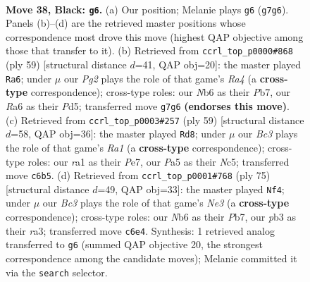 \documentclass[11pt]{article}
\begin{document}
\clearpage

\begin{figure}[p]\centering
\begin{subfigure}{0.46\textwidth}\centering
\resizebox{\linewidth}{!}{%
\newchessgame
\chessboard[
  setfen={5k2/2r2ppp/rnbN4/p3p1P1/8/1P2P1R1/P3K1PP/RN6 b - - 5 38},
  showmover=false,
  pgfstyle=straightmove, color=movearrow, markmove={g7-g6}
]}
\caption{}
\end{subfigure}\hfill
\begin{subfigure}{0.46\textwidth}\centering
\resizebox{\linewidth}{!}{%
\newchessgame
\chessboard[
  setfen={1b2r3/1p3pk1/5p2/r2p3p/p2N4/P1P5/1P3RPP/1K3R2 b - - 5 30},
  showmover=false,
  pgfstyle=straightmove, color=movearrow, markmove={a5-a6}
]}
\caption{}
\end{subfigure}
\\[4pt]
\begin{subfigure}{0.46\textwidth}\centering
\resizebox{\linewidth}{!}{%
\newchessgame
\chessboard[
  setfen={r7/pp2ppk1/6p1/2nPNbP1/3R4/4R1K1/P3PPB1/2r5 b - - 4 30},
  showmover=false,
  pgfstyle=straightmove, color=movearrow, markmove={a8-d8}
]}
\caption{}
\end{subfigure}\hfill
\begin{subfigure}{0.46\textwidth}\centering
\resizebox{\linewidth}{!}{%
\newchessgame
\chessboard[
  setfen={4r3/pp1r1p1k/4n2p/3p1N1P/3P2P1/R7/PP4R1/1K6 b - - 8 38},
  showmover=false,
  pgfstyle=straightmove, color=movearrow, markmove={e6-f4}
]}
\caption{}
\end{subfigure}
\caption{\textbf{Move 38, Black: \texttt{g6}.} (a) Our position; Melanie plays \texttt{g6} (\texttt{g7g6}). Panels (b)--(d) are the retrieved master positions whose correspondence most drove this move (highest QAP objective among those that transfer to it). (b) Retrieved from \texttt{ccrl\_top\_p0000\#868} (ply 59) [structural distance $d$=41, QAP obj=20]: the master played \texttt{Ra6}; under $\mu$ our \emph{Pg2} plays the role of that game's \emph{Ra4} (a \textbf{cross-type} correspondence); cross-type roles: our \emph{N}b6 as their \emph{P}b7, our \emph{R}a6 as their \emph{P}d5; transferred move \texttt{g7g6} \textbf{(endorses this move)}. (c) Retrieved from \texttt{ccrl\_top\_p0003\#257} (ply 59) [structural distance $d$=58, QAP obj=36]: the master played \texttt{Rd8}; under $\mu$ our \emph{Bc3} plays the role of that game's \emph{Ra1} (a \textbf{cross-type} correspondence); cross-type roles: our \emph{r}a1 as their \emph{P}e7, our \emph{P}a5 as their \emph{N}c5; transferred move \texttt{c6b5}. (d) Retrieved from \texttt{ccrl\_top\_p0001\#768} (ply 75) [structural distance $d$=49, QAP obj=33]: the master played \texttt{Nf4}; under $\mu$ our \emph{Bc3} plays the role of that game's \emph{Ne3} (a \textbf{cross-type} correspondence); cross-type roles: our \emph{N}b6 as their \emph{P}b7, our \emph{p}b3 as their \emph{r}a3; transferred move \texttt{c6e4}. Synthesis: 1 retrieved analog transferred to \texttt{g6} (summed QAP objective 20, the strongest correspondence among the candidate moves); Melanie committed it via the \texttt{search} selector.}
\label{fig:thought-m75}
\end{figure}
\end{document}
